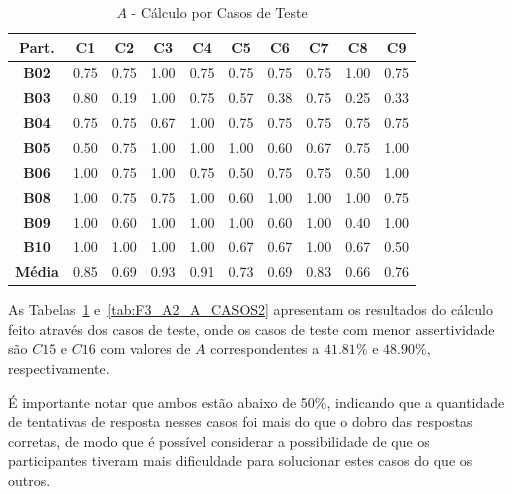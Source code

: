 \begin{table}[htbp]
	\centering
	\caption{$A$ - Cálculo por Casos de Teste}
	\begin{tabular}{|c|c|c|c|c|c|c|c|c|c|}
		\hline
		\rowcolor[HTML]{D9D9D9} 
		\cellcolor[HTML]{D0CECE}\textbf{Part.} & \textbf{C1} & \textbf{C2} & \textbf{C3} & \textbf{C4} & \textbf{C5} & \textbf{C6} & \textbf{C7} & \textbf{C8} & \textbf{C9} \\ \hline
		\textbf{B02} & 0.75 & 0.75 & 1.00 & 0.75 & 0.75 & 0.75 & 0.75 & 1.00 & 0.75 \\ \hline
		\rowcolor[HTML]{F2F2F2} 
		\textbf{B03} & 0.80 & 0.19 & 1.00 & 0.75 & 0.57 & 0.38 & 0.75 & 0.25 & 0.33 \\ \hline
		\textbf{B04} & 0.75 & 0.75 & 0.67 & 1.00 & 0.75 & 0.75 & 0.75 & 0.75 & 0.75 \\ \hline
		\rowcolor[HTML]{F2F2F2} 
		\textbf{B05} & 0.50 & 0.75 & 1.00 & 1.00 & 1.00 & 0.60 & 0.67 & 0.75 & 1.00 \\ \hline
		\textbf{B06} & 1.00 & 0.75 & 1.00 & 0.75 & 0.50 & 0.75 & 0.75 & 0.50 & 1.00 \\ \hline
		\rowcolor[HTML]{F2F2F2} 
		\textbf{B08} & 1.00 & 0.75 & 0.75 & 1.00 & 0.60 & 1.00 & 1.00 & 1.00 & 0.75 \\ \hline
		\textbf{B09} & 1.00 & 0.60 & 1.00 & 1.00 & 1.00 & 0.60 & 1.00 & 0.40 & 1.00 \\ \hline
		\rowcolor[HTML]{F2F2F2} 
		\textbf{B10} & 1.00 & 1.00 & 1.00 & 1.00 & 0.67 & 0.67 & 1.00 & 0.67 & 0.50 \\ \hline
		\textbf{Média} & 0.85 & 0.69 & 0.93 & 0.91 & 0.73 & 0.69 & 0.83 & 0.66 & 0.76 \\ \hline
	\end{tabular}
	\label{tab:F3_A2_A_CASOS}
\end{table}

As Tabelas~\ref{tab:F3_A2_A_CASOS} e~\ref{tab:F3_A2_A_CASOS2} apresentam os resultados do cálculo feito através dos casos de teste, onde os casos de teste com menor assertividade são $C15$ e $C16$ com valores de $A$ correspondentes a $41.81\%$ e $48.90\%$, respectivamente. 

É importante notar que ambos estão abaixo de 50\%, indicando que a quantidade de tentativas de resposta nesses casos foi mais do que o dobro das respostas corretas, de modo que é possível considerar a possibilidade de que os participantes tiveram mais dificuldade para solucionar estes casos do que os outros.

